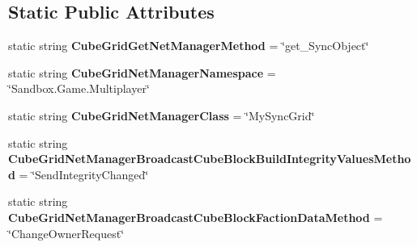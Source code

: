 \subsection*{Static Public Attributes}
\begin{DoxyCompactItemize}
\item 
\hypertarget{class_s_e_mod_a_p_i_internal_1_1_a_p_i_1_1_entity_1_1_sector_1_1_sector_object_1_1_cube_grid_network_manager_a652a415f2b383df38691eb52b6abd43b}{}static string {\bfseries Cube\+Grid\+Get\+Net\+Manager\+Method} = \char`\"{}get\+\_\+\+Sync\+Object\char`\"{}\label{class_s_e_mod_a_p_i_internal_1_1_a_p_i_1_1_entity_1_1_sector_1_1_sector_object_1_1_cube_grid_network_manager_a652a415f2b383df38691eb52b6abd43b}

\item 
\hypertarget{class_s_e_mod_a_p_i_internal_1_1_a_p_i_1_1_entity_1_1_sector_1_1_sector_object_1_1_cube_grid_network_manager_a528058e51c3d6e8d780489dfee642841}{}static string {\bfseries Cube\+Grid\+Net\+Manager\+Namespace} = \char`\"{}Sandbox.\+Game.\+Multiplayer\char`\"{}\label{class_s_e_mod_a_p_i_internal_1_1_a_p_i_1_1_entity_1_1_sector_1_1_sector_object_1_1_cube_grid_network_manager_a528058e51c3d6e8d780489dfee642841}

\item 
\hypertarget{class_s_e_mod_a_p_i_internal_1_1_a_p_i_1_1_entity_1_1_sector_1_1_sector_object_1_1_cube_grid_network_manager_a5e2f31f583fd509eab2e34de21d49b7e}{}static string {\bfseries Cube\+Grid\+Net\+Manager\+Class} = \char`\"{}My\+Sync\+Grid\char`\"{}\label{class_s_e_mod_a_p_i_internal_1_1_a_p_i_1_1_entity_1_1_sector_1_1_sector_object_1_1_cube_grid_network_manager_a5e2f31f583fd509eab2e34de21d49b7e}

\item 
\hypertarget{class_s_e_mod_a_p_i_internal_1_1_a_p_i_1_1_entity_1_1_sector_1_1_sector_object_1_1_cube_grid_network_manager_af162b59d0a84a9bcf3353e728449b099}{}static string {\bfseries Cube\+Grid\+Net\+Manager\+Broadcast\+Cube\+Block\+Build\+Integrity\+Values\+Method} = \char`\"{}Send\+Integrity\+Changed\char`\"{}\label{class_s_e_mod_a_p_i_internal_1_1_a_p_i_1_1_entity_1_1_sector_1_1_sector_object_1_1_cube_grid_network_manager_af162b59d0a84a9bcf3353e728449b099}

\item 
\hypertarget{class_s_e_mod_a_p_i_internal_1_1_a_p_i_1_1_entity_1_1_sector_1_1_sector_object_1_1_cube_grid_network_manager_a0769253f50d689267df416e84280aa0a}{}static string {\bfseries Cube\+Grid\+Net\+Manager\+Broadcast\+Cube\+Block\+Faction\+Data\+Method} = \char`\"{}Change\+Owner\+Request\char`\"{}\label{class_s_e_mod_a_p_i_internal_1_1_a_p_i_1_1_entity_1_1_sector_1_1_sector_object_1_1_cube_grid_network_manager_a0769253f50d689267df416e84280aa0a}


\end{DoxyCompactItemize}

